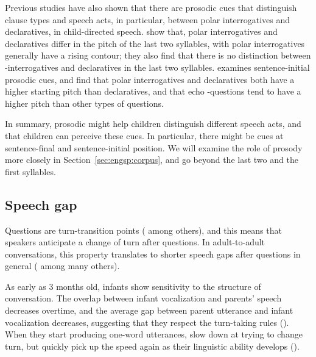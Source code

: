 Previous studies have also shown that there are prosodic cues that distinguish clause types and speech acts, in particular, between polar interrogatives and declaratives, in child-directed speech. \textcite{geffenmintz2017final} show that, polar interrogatives and declaratives differ in the pitch of the last two syllables, with polar interrogatives generally have a rising contour; they also find that there is no distinction between \twh-interrogatives and declaratives in the last two syllables. \textcite{chianggeffenmintz2018initial} examines sentence-initial prosodic cues, and find that polar interrogatives and declaratives both have a higher starting pitch than declaratives, and that echo \twh-questions tend to have a higher pitch than other types of questions. %

In summary, prosodic might help children distinguish different speech acts, and that children can perceive these cues. In particular, there might be cues at sentence-final and sentence-initial position. We will examine the role of prosody more closely in Section~\ref{sec:engsp:corpus}, and go beyond the last two and the first syllables.

\subsection{Speech gap}
\label{sec:engsp:bg:pause}
Questions are turn-transition points (\cite{duncan1972turn} among others), and this means that speakers anticipate a change of turn after questions. In adult-to-adult conversations, this property translates to shorter speech gaps after questions in general (\cite{stivers2010,enfield2010,hilbrink2013turn} among many others). 



As early as 3 months old, infants show sensitivity to the structure of conversation. The overlap between infant vocalization and parents' speech decreases overtime, and the average gap between parent utterance and infant vocalization decreases, suggesting that they respect the turn-taking rules (\cite{hilbrink2013turn3mo}). When they start producing one-word utterances, slow down at trying to change turn, but quickly pick up the speed again as their linguistic ability develops (\cite{hilbrink2013turn}). 



